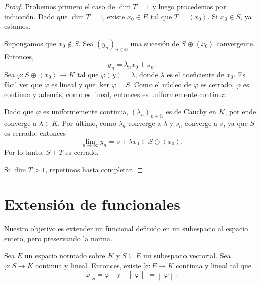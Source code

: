 \begin{proof}
	Probemos primero el caso de $\dim T = 1$ y luego procedemos por inducción. Dado que $\dim T = 1$, existe $x_0 \in E$ tal que $T = \left\langle x_0 \right\rangle$. Si $x_0 \in S$, ya estamos.

	Supongamos que $x_0 \not \in S$. Sea $(y_n)_{n \in \mathbb{N}}$ una sucesión de $S \oplus \left\langle x_0 \right\rangle$ convergente. Entonces,
	\begin{equation*}
		y_n = \lambda_n x_0 + s_n.
	\end{equation*}
	Sea $\varphi : S \oplus \left\langle x_0 \right\rangle \to K$ tal que $\varphi(y) = \lambda$, donde $\lambda$ es el coeficiente de $x_0$. Es fácil ver que $\varphi$ es lineal y que $\ker \varphi = S$. Como el núcleo de $\varphi$ es cerrado, $\varphi$ es continua y además, como es lineal, entonces es uniformemente continua.

	Dado que $\varphi$ es uniformemente continua, $(\lambda_n)_{n \in \mathbb{N}}$ es de Cauchy en $K$, por ende converge a $\lambda \in K$. Por último, como $\lambda_n$ converge a $\lambda$ y $s_n$ converge a $s$, ya que $S$ es cerrado, entonces
	\begin{equation*}
		\lim_{n \to \infty} y_n = s + \lambda x_0 \in S \oplus \left\langle x_0 \right\rangle.
	\end{equation*}
	Por lo tanto, $S + T$ es cerrado.

	Si $\dim T > 1$, repetimos hasta completar.
\end{proof}


\section{Extensión de funcionales}

Nuestro objetivo es extender un funcional definido en un subespacio al espacio entero, pero preservando la norma.

\begin{theorem}
	Sea $E$ un espacio normado sobre $K$ y $S \subseteq E$ un subespacio vectorial. Sea $\varphi : S \to K$ continua y lineal. Entonces, existe $\tilde{\varphi} : E \to K$ continua y lineal tal que
	\begin{equation*}
		\tilde{\varphi}|_S = \varphi \quad \text{y} \quad \left\lVert \tilde{\varphi} \right\rVert = \left\lVert \varphi \right\rVert.
	\end{equation*}
\end{theorem}

